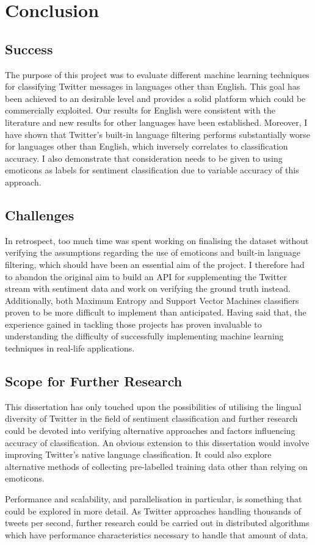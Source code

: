 \chapter{Conclusion}

\section{Success}

The purpose of this project was to evaluate different machine learning techniques for classifying Twitter messages in languages other than English. This goal has been achieved to an desirable level and provides a solid platform which could be commercially exploited. Our results for English were consistent with the literature and new results for other languages have been established. Moreover, I have shown that Twitter's built-in language filtering performs substantially worse for languages other than English, which inversely correlates to classification accuracy. I also demonstrate that consideration needs to be given to using emoticons as labels for sentiment classification due to variable accuracy of this approach.

\section{Challenges}

In retrospect, too much time was spent working on finalising the dataset without verifying the assumptions regarding the use of emoticons and built-in language filtering, which should have been an essential aim of the project. I therefore had to abandon the original aim to build an API for supplementing the Twitter stream with sentiment data and work on verifying the ground truth instead. Additionally, both Maximum Entropy and Support Vector Machines classifiers proven to be more difficult to implement than anticipated. Having said that, the experience gained in tackling those projects has proven invaluable to understanding the difficulty of successfully implementing machine learning techniques in real-life applications. 

\section{Scope for Further Research}

This dissertation has only touched upon the possibilities of utilising the lingual diversity of Twitter in the field of sentiment classification and further research could be devoted into verifying alternative approaches and factors influencing accuracy of classification. An obvious extension to this dissertation would involve improving Twitter's native language classification. It could also explore alternative methods of collecting pre-labelled training data other than relying on emoticons.

Performance and scalability, and parallelisation in particular, is something that could be explored in more detail. As Twitter approaches handling thousands of tweets per second, further research could be carried out in distributed algorithms which have performance characteristics necessary to handle that amount of data.